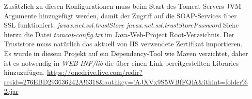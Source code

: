 \documentclass[11pt, a4paper, twoside]{article}   	%
\begin{document}
Zusätzlich zu diesen Konfigurationen muss beim Start des Tomcat-Servers JVM-Argumente hinzugefügt werden, damit der Zugriff auf die SOAP-Services über SSL funktioniert.
\newline
\newline
\emph{javax.net.ssl.trustStore}
\newline
\emph{javax.net.ssl.trustStorePassword}
\newline
\newline
Siehe hierzu die Datei \emph{tomcat-config.txt} im Java-Web-Project Root-Verzeichnis. Der Truststore muss natürlich das aktuell von IIS verwendete Zertifikat importieren.
\newline
\newline
Es wurde in diesem Projekt auf ein Dependency-Tool wie Maven verzichtet, daher ist es notwendig in \emph{WEB-INF/lib} die über einen Link bereitgestellten Libraries hinzuzufügen. 
\newline
\url{https://onedrive.live.com/redir?resid=276EBD293636242A!6318&authkey=!AJXVx9S5WBfFQlA&ithint=folder%2cjar}
\ \newpage
\end{document}
